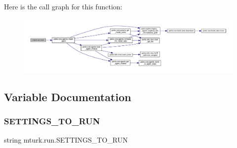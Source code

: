 Here is the call graph for this function\+:
\nopagebreak
\begin{figure}[H]
\begin{center}
\leavevmode
\includegraphics[width=350pt]{namespacemturk_1_1run_a742d6dfa1609938f250301a87485462a_cgraph}
\end{center}
\end{figure}


\subsection{Variable Documentation}
\mbox{\label{namespacemturk_1_1run_a11d1a35eaa86c09de7a36ceb7e524374}} 
\subsubsection{\texorpdfstring{S\+E\+T\+T\+I\+N\+G\+S\+\_\+\+T\+O\+\_\+\+R\+UN}{SETTINGS\_TO\_RUN}}
{\footnotesize\ttfamily string mturk.\+run.\+S\+E\+T\+T\+I\+N\+G\+S\+\_\+\+T\+O\+\_\+\+R\+UN}


